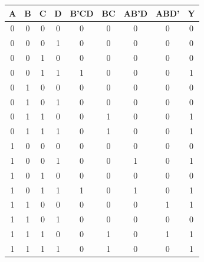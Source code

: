 \documentclass{article}
\begin{document}
    \quad\quad
    \noindent{}

    \begin{center}
        \begin{tabular}{ c|c|c|c|c|c|c|c|c }
            A & B & C & D & B'CD & BC & AB'D & ABD' & Y \\
            \hline
            0 & 0 & 0 & 0 & 0& 0& 0& 0& 0\\
            0 & 0 & 0 & 1 & 0& 0& 0& 0& 0\\
            0 & 0 & 1 & 0 & 0& 0& 0& 0& 0\\
            0 & 0 & 1 & 1 & 1& 0& 0& 0& 1\\
            0 & 1 & 0 & 0 & 0& 0& 0& 0& 0\\
            0 & 1 & 0 & 1 & 0& 0& 0& 0& 0\\
            0 & 1 & 1 & 0 & 0& 1& 0& 0& 1\\
            0 & 1 & 1 & 1 & 0& 1& 0& 0& 1\\
            1 & 0 & 0 & 0 & 0& 0& 0& 0& 0\\
            1 & 0 & 0 & 1 & 0& 0& 1& 0& 1\\
            1 & 0 & 1 & 0 & 0& 0& 0& 0& 0\\
            1 & 0 & 1 & 1 & 1& 0& 1& 0& 1\\
            1 & 1 & 0 & 0 & 0& 0& 0& 1& 1\\
            1 & 1 & 0 & 1 & 0& 0& 0& 0& 0\\
            1 & 1 & 1 & 0 & 0& 1& 0& 1& 1\\
            1 & 1 & 1 & 1 & 0& 1& 0& 0& 1
            

\end{tabular}
\end{center}
\end{document}
